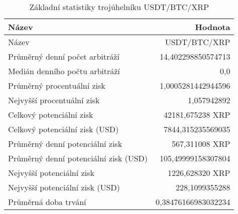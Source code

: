 \begin{table}\centering
\caption{Základní statistiky trojúhelníku USDT/BTC/XRP}
\label{USDTBTCXRP_stats}
\begin{tabular}{|| l | r ||}
\hline Název & Hodnota \\ 
\hline\hline Název & USDT/BTC/XRP \\ 
\hline Průměrný denní počet arbitráží & 14,402298850574713 \\ 
\hline Medián denního počtu arbitráží & 0,0 \\ 
\hline Průměrný procentuální zisk & 1,0005281442944596 \\ 
\hline Nejvyšší procentuální zisk & 1,057942892 \\ 
\hline Celkový potenciální zisk & 42181,675238 XRP \\ 
\hline Celkový potenciální zisk (USD) & 7844,315235569035 \\ 
\hline Průměrný denní potenciální zisk & 567,311008 XRP \\ 
\hline Průměrný denní potenciální zisk (USD) & 105,49999158307804 \\ 
\hline Nejvyšší potenciální zisk & 1226,628320 XRP \\ 
\hline Nejvyšší potenciální zisk (USD) & 228,1099355288 \\ 
\hline Průměrná doba trvání & 0,38476166983032234 \\ 
\hline
\end{tabular}
\end{table}
